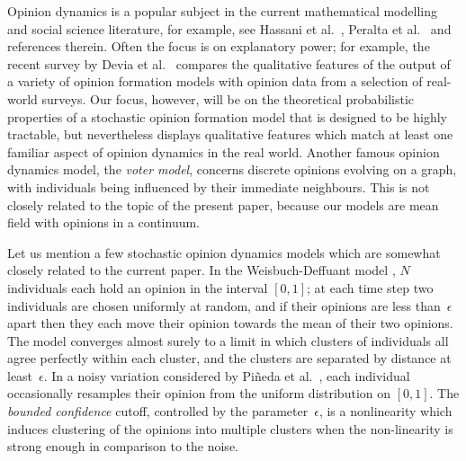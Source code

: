 \documentclass[12pt]{article}
\newcommand{\1}{\mathbf{1}}
\begin{document}
Opinion dynamics is a popular subject in the current mathematical modelling and social science literature, for example, see Hassani et al.~\cite{fusion}, Peralta et al.~\cite{PKI} and references therein. Often the focus is on explanatory power; for example, the recent survey by Devia et al.~\cite{Devia} compares the qualitative features of the output of a variety of opinion formation models with opinion data from a selection of real-world surveys. Our focus, however, will be on the theoretical probabilistic properties of a stochastic opinion formation model that is designed to be highly tractable, but nevertheless displays qualitative features which match at least one familiar aspect of opinion dynamics in the real world. {Another famous opinion dynamics model, the \emph{voter model}, concerns discrete opinions evolving on a graph, with individuals being influenced by their immediate neighbours. This is not closely related to the topic of the present paper, because our models are mean field with opinions in a continuum.} 
%


Let us mention a few stochastic opinion dynamics models which are somewhat closely related to the current paper. In the Weisbuch-Deffuant model \cite{DWmodel}, $N$ individuals each hold an opinion in the interval $[0,1]$; at each time step two individuals are chosen uniformly at random, and if their opinions are less than~$\epsilon$ apart then they each move their opinion towards the mean of their two opinions. The model converges almost surely to a limit in which clusters of individuals all agree perfectly within each cluster, and the clusters are separated by distance at least~$\epsilon$. In a noisy variation considered by Pi\~{n}eda et al.~\cite{Pineda}, each individual occasionally resamples their opinion from the uniform distribution on $[0,1]$. The \emph{bounded confidence} cutoff, controlled by the parameter~$\epsilon$, is a nonlinearity which induces clustering of the opinions into multiple clusters when the non-linearity is strong enough in comparison to the noise. 
\end{document}
